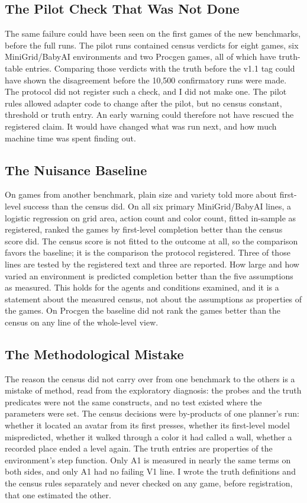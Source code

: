 \documentclass[twocolumn]{svjour3}
\begin{document}
\subsection{The Pilot Check That Was Not Done}\label{sec:pilot}

The same failure could have been seen on the first games of the new
benchmarks, before the full runs. The pilot runs contained census
verdicts for eight games, six MiniGrid/BabyAI environments and two
Procgen games, all of which have truth-table entries. Comparing those
verdicts with the truth before the v1.1 tag could have shown the
disagreement before the 10,500 confirmatory runs were made. The protocol
did not register such a check, and I did not make one. The pilot rules
allowed adapter code to change after the pilot, but no census constant,
threshold or truth entry. An early warning could therefore not have
rescued the registered claim. It would have changed what was run next,
and how much machine time was spent finding out.

\subsection{The Nuisance Baseline}\label{sec:baseline}

On games from another benchmark, plain size and variety told more about
first-level success than the census did. On all six primary
MiniGrid/BabyAI lines, a logistic regression on grid area, action count
and color count, fitted in-sample as registered, ranked the games by
first-level completion better than the census score did. The census
score is not fitted to the outcome at all, so the comparison favors the
baseline; it is the comparison the protocol registered. Three of those
lines are tested by the registered text and three are reported. How
large and how varied an environment is predicted completion better than
the five assumptions as measured. This holds for the agents and
conditions examined, and it is a statement about the measured census,
not about the assumptions as properties of the games. On Procgen the
baseline did not rank the games better than the census on any line of
the whole-level view.

\subsection{The Methodological Mistake}\label{sec:mistake}

The reason the census did not carry over from one benchmark to the
others is a mistake of method, read from the exploratory diagnosis: the
probes and the truth predicates were not the same constructs, and no
test existed where the parameters were set. The census decisions were
by-products of one planner's run: whether it located an avatar from its
first presses, whether its first-level model mispredicted, whether it
walked through a color it had called a wall, whether a recorded place
ended a level again. The truth entries are properties of the
environment's step function. Only A1 is measured in nearly the same
terms on both sides, and only A1 had no failing V1 line. I wrote the
truth definitions and the census rules separately and never checked on
any game, before registration, that one estimated the other.
\end{document}
